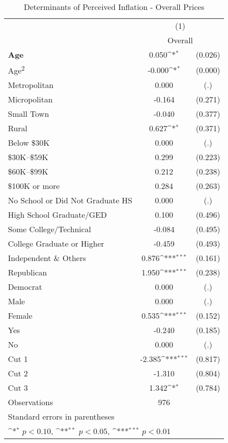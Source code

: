 \begin{table}[htbp]\centering
\def\sym#1{\ifmmode^{#1}\else\(^{#1}\)\fi}
\caption{Determinants of Perceived Inflation - Overall Prices}
\begin{tabular}{l*{1}{cc}}
\hline\hline
                    &\multicolumn{2}{c}{(1)}           \\
                    &\multicolumn{2}{c}{Overall}       \\
\hline
\textbf{Age}        &       0.050\sym{*}  &     (0.026)\\
Age\textsuperscript{2}&      -0.000\sym{*}  &     (0.000)\\
Metropolitan        &       0.000         &         (.)\\
Micropolitan        &      -0.164         &     (0.271)\\
Small Town          &      -0.040         &     (0.377)\\
Rural               &       0.627\sym{*}  &     (0.371)\\
Below \$30K         &       0.000         &         (.)\\
\$30K--\$59K        &       0.299         &     (0.223)\\
\$60K--\$99K        &       0.212         &     (0.238)\\
\$100K or more      &       0.284         &     (0.263)\\
No School or Did Not Graduate HS&       0.000         &         (.)\\
High School Graduate/GED&       0.100         &     (0.496)\\
Some College/Technical&      -0.084         &     (0.495)\\
College Graduate or Higher&      -0.459         &     (0.493)\\
Independent \& Others&       0.876\sym{***}&     (0.161)\\
Republican          &       1.950\sym{***}&     (0.238)\\
Democrat            &       0.000         &         (.)\\
Male                &       0.000         &         (.)\\
Female              &       0.535\sym{***}&     (0.152)\\
Yes                 &      -0.240         &     (0.185)\\
No                  &       0.000         &         (.)\\
Cut 1               &      -2.385\sym{***}&     (0.817)\\
Cut 2               &      -1.310         &     (0.804)\\
Cut 3               &       1.342\sym{*}  &     (0.784)\\
\hline
Observations        &         976         &            \\
\hline\hline
\multicolumn{3}{l}{\footnotesize Standard errors in parentheses}\\
\multicolumn{3}{l}{\footnotesize \sym{*} \(p<0.10\), \sym{**} \(p<0.05\), \sym{***} \(p<0.01\)}\\
\end{tabular}
\end{table}
